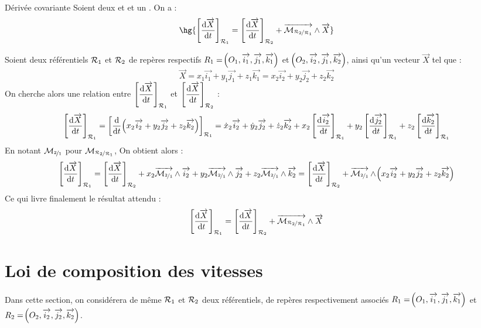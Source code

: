 \documentclass[a4paper,french,bookmarks]{book}
\begin{document}
    \begin{property}{Dérivée covariante}{}
        Soient deux  et  et un . On a :
        \[ \hg{\intc{\dfrac{\dif \vec X}{\dif t}}_{\bcR_1} = \intc{\dfrac{\dif \vec X}{\dif t}}_{\bcR_2} + \vec{\bcM_{\sfrac{\bcR_2}{\bcR_1}}} \land \vec{X}}\]
    \end{property}
    \begin{nproof}
        Soient deux référentiels $\mathcal{R}_1$ et $\mathcal{R}_2$ de repères respectifs $R_1 = \!\left(O_1, \overrightarrow{i_1}, \overrightarrow{j_1}, \overrightarrow{k_1}\right)$ et $\!\left(O_2, \overrightarrow{i_2}, \overrightarrow{j_1}, \overrightarrow{k_2}\right)$, ainsi qu'un vecteur $\vec X$ tel que :
        \[ \vec X = x_1 \vec{i_1} + y_1 \vec{j_1} + z_1 \vec{k_1}
        = x_2 \vec{i_2} + y_2 \vec{j_2} + z_2 \vec{k_2}\]
        On cherche alors une relation entre $\left[\dfrac{\mathrm d \overrightarrow{X}}{\mathrm d t}\right]_{\mathcal{R}_1}$ et $\left[\dfrac{\mathrm d \overrightarrow{X}}{\mathrm d t}\right]_{\mathcal{R}_2}$ :
        \[
            \left[\dfrac{\mathrm d \overrightarrow{X}}{\mathrm d t}\right]_{\mathcal{R}_1} = \left[\dfrac{\mathrm d}{\mathrm d t}\!\left(x_2\overrightarrow{i_2} + y_2\overrightarrow{j_2} + z_2\overrightarrow{k_2}\right)\right]_{\mathcal{R}_1} = \dot x_2\overrightarrow{i_2} + \dot y_2\overrightarrow{j_2} + \dot z_2\overrightarrow{k_2} + x_2\left[\dfrac{\mathrm d \overrightarrow{i_2}}{\mathrm d t}\right]_{\mathcal{R}_1} + y_2\left[\dfrac{\mathrm d \overrightarrow{j_2}}{\mathrm d t}\right]_{\mathcal{R}_1} + z_2\left[\dfrac{\mathrm d \overrightarrow{k_2}}{\mathrm d t}\right]_{\mathcal{R}_1}
        \]
        En notant $\mathcal{M}_{\nicefrac{2}{1}}$ pour $\mathcal{M}_{\nicefrac{\mathcal{R}_2}{\mathcal{R}_1}}$, On obtient alors :
        \[ \left[\dfrac{\mathrm d \overrightarrow{X}}{\mathrm d t}\right]_{\mathcal{R}_1} = \left[\dfrac{\mathrm d \overrightarrow{X}}{\mathrm d t}\right]_{\mathcal{R}_2} + x_2 \overrightarrow{\mathcal{M}_{\nicefrac{2}{1}}} \wedge \overrightarrow{i_2} + y_2 \overrightarrow{\mathcal{M}_{\nicefrac{2}{1}}} \wedge \overrightarrow{j_2} + z_2 \overrightarrow{\mathcal{M}_{\nicefrac{2}{1}}} \wedge \overrightarrow{k_2} = \left[\dfrac{\mathrm d \overrightarrow{X}}{\mathrm d t}\right]_{\mathcal{R}_2} + \overrightarrow{\mathcal{M}_{\nicefrac{2}{1}}} \wedge \!\left(x_2 \overrightarrow{i_2} + y_2 \overrightarrow{j_2} + z_2 \overrightarrow{k_2}\right)\]
        Ce qui livre finalement le résultat attendu :
        \[ \left[\dfrac{\mathrm d \overrightarrow{X}}{\mathrm d t}\right]_{\mathcal{R}_1} = \left[\dfrac{\mathrm d \overrightarrow{X}}{\mathrm d t}\right]_{\mathcal{R}_2} + \overrightarrow{\mathcal{M}_{\nicefrac{\mathcal{R}_2}{\mathcal{R}_1}}} \land \overrightarrow{X}\]
    \end{nproof}

    
    \section{Loi de composition des vitesses}
    
    Dans cette section, on considérera de même $\mathcal{R}_1$ et $\mathcal{R}_2$ deux référentiels, de repères respectivement associés $R_1 = \!\left(O_1, \overrightarrow{i_1}, \overrightarrow{j_1}, \overrightarrow{k_1}\right)$ et $R_2 = \!\left(O_2, \overrightarrow{i_2}, \overrightarrow{j_2}, \overrightarrow{k_2}\right)$.
    
\end{document}
